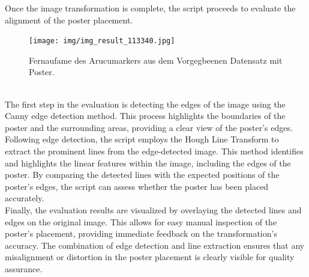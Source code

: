 \documentclass[a4paper,twocolumn]{article}
\begin{document}
Once the image transformation is complete, the script proceeds to evaluate the alignment of the poster placement.
\begin{figure}[h!]
    \centering
    \texttt{[image: img/img\_result\_113340.jpg]} %
    \caption{Fernaufame des Arucumarkers aus dem Vorgegbeenen Datensatz mit Poster.}
    \label{fig:example-result}
\end{figure}
 \\
 The first step in the evaluation is detecting the edges of the image using the Canny edge detection method. This process highlights the boundaries of the poster and the surrounding areas, providing a clear view of the poster's edges.
Following edge detection, the script employs the Hough Line Transform to extract the prominent lines from the edge-detected image. This method identifies and highlights the linear features within the image, including the edges of the poster. By comparing the detected lines with the expected positions of the poster's edges, the script can assess whether the poster has been placed accurately.
\\
Finally, the evaluation results are visualized by overlaying the detected lines and edges on the original image. This allows for easy manual inspection of the poster’s placement, providing immediate feedback on the transformation’s accuracy. The combination of edge detection and line extraction ensures that any misalignment or distortion in the poster placement is clearly visible for quality assurance.
\end{document}
